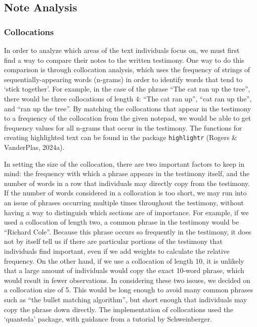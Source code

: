 \documentclass[print]{nuthesis}
\begin{document}
\hypertarget{note-analysis}{%
\subsection{Note Analysis}\label{note-analysis}}

\hypertarget{collocations}{%
\subsubsection{Collocations}\label{collocations}}

In order to analyze which areas of the text individuals focus on, we must first find a way to compare their notes to the written testimony.
One way to do this comparison is through collocation analysis, which uses the frequency of strings of sequentially-appearing words (n-grams) in order to identify words that tend to `stick together'.
For example, in the case of the phrase ``The cat ran up the tree'', there would be three collocations of length 4: ``The cat ran up'', ``cat ran up the'', and ``ran up the tree''.
By matching the collocations that appear in the testimony to a frequency of the collocation from the given notepad, we would be able to get frequency values for all n-grams that occur in the testimony.
The functions for creating highlighted text can be found in the package \texttt{highlightr} (Rogers \& VanderPlas, 2024a).

In setting the size of the collocation, there are two important factors to keep in mind: the frequency with which a phrase appears in the testimony itself, and the number of words in a row that individuals may directly copy from the testimony.
If the number of words considered in a collocation is too short, we may run into an issue of phrases occurring multiple times throughout the testimony, without having a way to distinguish which sections are of importance.
For example, if we used a collocation of length two, a common phrase in the testimony would be ``Richard Cole''.
Because this phrase occurs so frequently in the testimony, it does not by itself tell us if there are particular portions of the testimony that individuals find important, even if we add weights to calculate the relative frequency.
On the other hand, if we use a collocation of length 10, it is unlikely that a large amount of individuals would copy the exact 10-word phrase, which would result in fewer observations.
In considering these two issues, we decided on a collocation size of 5.
This would be long enough to avoid many common phrases such as ``the bullet matching algorithm'', but short enough that individuals may copy the phrase down directly.
The implementation of collocations used the `quanteda' package, with guidance from a tutorial by Schweinberger.
\end{document}
